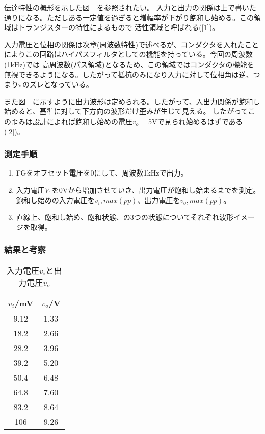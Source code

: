 \documentclass[11pt,a4j,titlepage]{jsarticle}
\begin{document}
   伝達特性の概形を示した図\ \ を参照されたい。
   入力と出力の関係は上で書いた通りになる。ただしある一定値を過ぎると増幅率が下がり飽和し始める。この領域はトランジスターの特性によるもので
   活性領域と呼ばれる([1])。
   
   入力電圧と位相の関係は次章(周波数特性)で述べるが、コンダクタを入れたことによりこの回路はハイパスフィルタとしての機能を持っている。今回の周波数(1kHz)では
   高周波数(パス領域)となるため、この領域ではコンダクタの機能を無視できるようになる。したがって抵抗のみになり入力に対して位相角は逆、つまり$\pi$のズレとなっている。
   
   また図\ \ に示すように出力波形は定められる。したがって、入出力関係が飽和し始めると、基準に対して下方向の波形だけ歪みが生じて見える。
   したがってこの歪みは設計によれば飽和し始めの電圧$v_o=$5Vで見られ始めるはずである([2])。
   
   \newpage
  
   \subsubsection{測定手順}
  
  \begin{enumerate}
   \item FGをオフセット電圧を0にして、周波数1kHzで出力。
   \item 入力電圧$V_1$を0Vから増加させていき、出力電圧が飽和し始まるまでを測定。飽和し始めの入力電圧を$v_i,max(pp)$、出力電圧を$v_o,max(pp)$。
   \item 直線上、飽和し始め、飽和状態、の3つの状態についてそれぞれ波形イメージを取得。
  \end{enumerate}

  
  
   \subsubsection{結果と考察}
   
 
 \begin{table}[htb]
  \begin{center}
    \caption{入力電圧$v_i$と出力電圧$v_o$}
    \begin{tabular}{cc} \toprule
$v_i$/mV	&	$v_o$/V	\\ \midrule
9.12	&	1.33	\\
18.2	&	2.66	\\
28.2	&	3.96	\\
39.2	&	5.20	\\
50.4	&	6.48	\\
64.8	&	7.60	\\
83.2	&	8.64	\\
106	&	9.26	\\ \bottomrule
    \end{tabular}
    \label{tab:price}
  \end{center}
\end{table}
\end{document}
